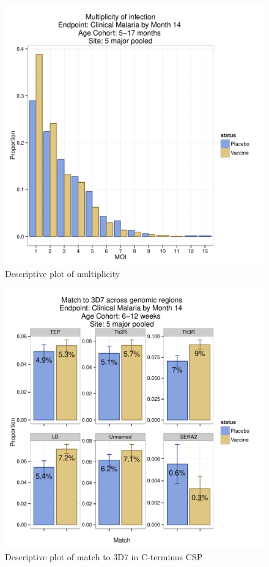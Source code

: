 \documentclass[]{article}
\begin{document}
\begin{figure}[htbp]
\centering
\includegraphics{figures/moi-infant-c-1.pdf}
\caption{Descriptive plot of multiplicity}
\end{figure}

\begin{figure}[htbp]
\centering
\includegraphics{figures/match-newborn-c-1.pdf}
\caption{Descriptive plot of match to 3D7 in C-terminus CSP}
\end{figure}
\end{document}
